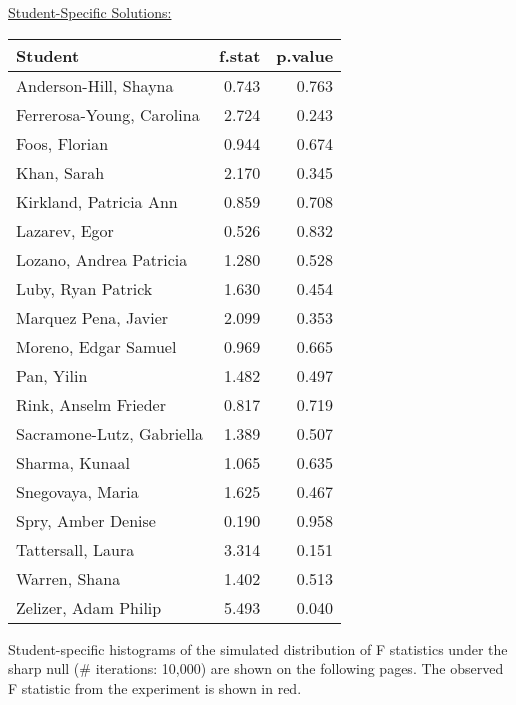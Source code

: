 \documentclass[11pt,notitlepage]{article}
\begin{document}
\clearpage

\underline{{\sc Student-Specific Solutions:}}

\begin{table}[h!]
\begin{center}
\begin{tabular}{lrr}
  \hline
  Student & f.stat & p.value \\ 
  \hline
Anderson-Hill, Shayna & 0.743 & 0.763 \\ 
  Ferrerosa-Young, Carolina & 2.724 & 0.243 \\ 
  Foos, Florian & 0.944 & 0.674 \\ 
  Khan, Sarah & 2.170 & 0.345 \\ 
  Kirkland, Patricia Ann & 0.859 & 0.708 \\ 
  Lazarev, Egor & 0.526 & 0.832 \\ 
  Lozano, Andrea Patricia & 1.280 & 0.528 \\ 
  Luby, Ryan Patrick & 1.630 & 0.454 \\ 
  Marquez Pena, Javier & 2.099 & 0.353 \\ 
  Moreno, Edgar Samuel & 0.969 & 0.665 \\ 
  Pan, Yilin & 1.482 & 0.497 \\ 
  Rink, Anselm Frieder & 0.817 & 0.719 \\ 
  Sacramone-Lutz, Gabriella & 1.389 & 0.507 \\ 
  Sharma, Kunaal & 1.065 & 0.635 \\ 
  Snegovaya, Maria & 1.625 & 0.467 \\ 
  Spry, Amber Denise & 0.190 & 0.958 \\ 
  Tattersall, Laura & 3.314 & 0.151 \\ 
  Warren, Shana & 1.402 & 0.513 \\ 
  Zelizer, Adam Philip & 5.493 & 0.040 \\ 
   \hline
\end{tabular}
\end{center}
\end{table}

Student-specific histograms of the simulated distribution of F statistics under the sharp null (\# iterations: 10,000) are shown on the following pages. The observed F statistic from the experiment is shown in red.

\clearpage 
\end{document}

